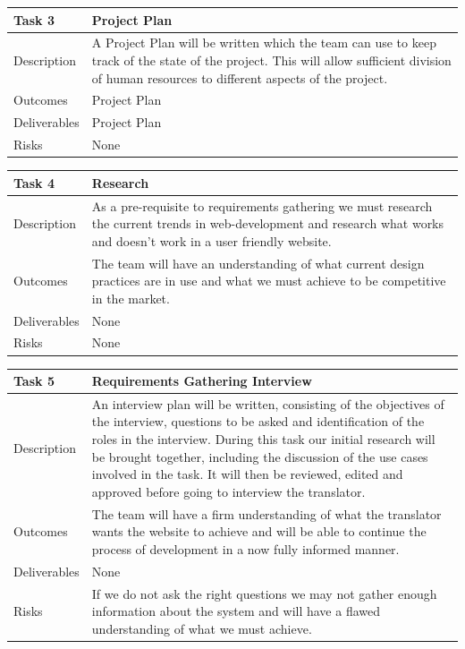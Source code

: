 \documentclass{l3proj}
\begin{document}
\begin{center}
    \begin{tabular}{ | l | p{12cm} |}
    \hline	
    Task 3 & Project Plan \\ \hline
    Description & A Project Plan will be written which the team can use to keep track of the state of the project. This will allow sufficient division of human resources to different aspects of the project. \\ \hline   
    Outcomes & Project Plan \\ \hline
    Deliverables & Project Plan \\ \hline
    Risks & None \\ 
    \hline
    \end{tabular}
\end{center}

\begin{center}
    \begin{tabular}{ | l | p{12cm} |}
    \hline	
    Task 4 & Research \\ \hline
    Description & As a pre-requisite to requirements gathering we must research the current trends in web-development and research what works and doesn't work in a user friendly website. \\ \hline   
    Outcomes & The team will have an understanding of what current design practices are in use and what we must achieve to be competitive in the market. \\ \hline
    Deliverables & None \\ \hline
    Risks & None \\ 
    \hline
    \end{tabular}
\end{center}

\begin{center}
    \begin{tabular}{ | l | p{12cm} |}
    \hline	
    Task 5 & Requirements Gathering Interview \\ \hline
    Description & An interview plan will be written, consisting
          of the objectives of the interview, questions to be asked and
          identification of the roles in the interview. During this task our initial research will be brought together, including the discussion of the use cases involved in the task. It will then be
          reviewed, edited and approved before going to interview the translator. \\ \hline   
    Outcomes & The team will have a firm understanding of what the translator wants the website to achieve and will be able to continue the process of development in a now fully informed manner. \\ \hline
    Deliverables & None \\ \hline
    Risks & If we do not ask the right questions we may not gather enough information about the system and will have a flawed understanding of what we must achieve. \\ 
    \hline
    \end{tabular}
\end{center}
\end{document}
